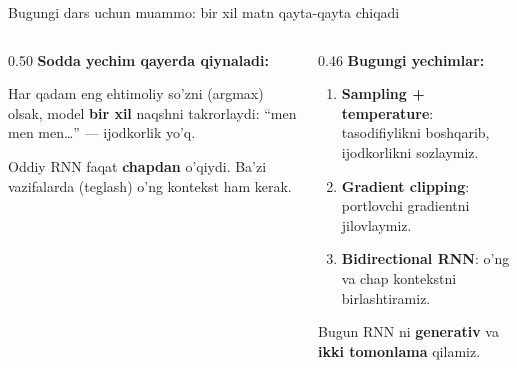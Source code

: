 \documentclass[aspectratio=169,11pt]{beamer}
\begin{document}
\begin{frame}{Bugungi dars uchun muammo: bir xil matn qayta-qayta chiqadi}
  \begin{columns}[T]
    \begin{column}{0.50\textwidth}
      \textbf{Sodda yechim qayerda qiynaladi:}\\[3pt]
      \small
      \begin{tcolorbox}[warnbox,title={Ochko'z (greedy) tanlash zerikarli},top=2pt,bottom=2pt]
        \footnotesize
        Har qadam eng ehtimoliy so'zni (argmax) olsak, model \textbf{bir xil}
        naqshni takrorlaydi: ``men men men\ldots'' --- ijodkorlik yo'q.
      \end{tcolorbox}
      \vspace{3pt}
      \begin{tcolorbox}[warnbox,title={Faqat o'tmishni ko'rish},top=2pt,bottom=2pt]
        \footnotesize
        Oddiy RNN faqat \textbf{chapdan} o'qiydi. Ba'zi vazifalarda (teglash) o'ng
        kontekst ham kerak.
      \end{tcolorbox}
    \end{column}
    \begin{column}{0.46\textwidth}
      \textbf{Bugungi yechimlar:}\\[4pt]
      \small
      \begin{enumerate}\setlength\itemsep{4pt}
        \item \textbf{Sampling + temperature}: tasodifiylikni boshqarib, ijodkorlikni
              sozlaymiz.
        \item \textbf{Gradient clipping}: portlovchi gradientni jilovlaymiz.
        \item \textbf{Bidirectional RNN}: o'ng va chap kontekstni birlashtiramiz.
      \end{enumerate}
      \vspace{5pt}
      \begin{tcolorbox}[okbox,top=2pt,bottom=2pt]
        \footnotesize
        Bugun RNN ni \textbf{generativ} va \textbf{ikki tomonlama} qilamiz.
      \end{tcolorbox}
    \end{column}
  \end{columns}
\end{frame}

\end{document}
